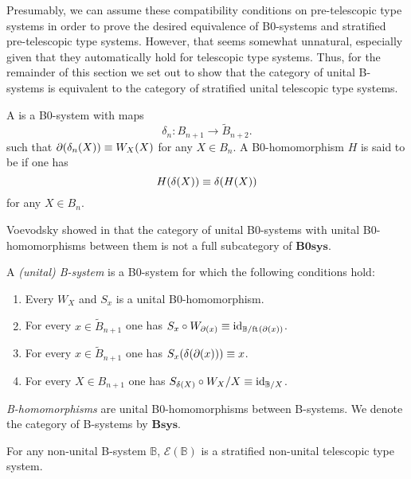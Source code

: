 Presumably, we can assume these compatibility conditions on pre-telescopic type systems in order
to prove the desired equivalence of B0-systems and stratified pre-telescopic type systems. However,
that seems somewhat unnatural, especially given that they automatically hold
for telescopic type systems. Thus, for the remainder of this section we set out to show that
the category of unital B-systems is equivalent to the category of stratified 
unital telescopic type systems.

\begin{defn}
A  is a B0-system with maps
\begin{equation*}
\delta_n : B_{n+1}\to \tilde{B}_{n+2}.
\end{equation*}
such that $\partial_{}(\delta_n(X))\equiv W_{X}(X)$ for any $X\in B_n$. 
A B0-homomorphism $H$ is said to be  if one has
\begin{equation*}
H(\delta(X))\equiv\delta(H(X))
\end{equation*}
for any $X\in B_n$.  
\end{defn}

\begin{rmk}
Voevodsky showed in \cite{VV_B-systems} that the category of unital B0-systems
with unital B0-homomorphisms between them is not a full
subcategory of $\mathbf{B0sys}$. 
\end{rmk}

\begin{defn}
A \emph{(unital) B-system} is a B0-system for which the following conditions
hold:
\begin{enumerate}
\item Every $W_X$ and $S_x$ is a unital B0-homomorphism.
\item For every $x\in \tilde{B}_{n+1}$ one has $S_x\circ W_{\partial_{}(x)}\equiv
{\mathrm{id}_{\mathbb{B}/\mathrm{ft}_{}(\partial_{}(x))}}$. 
\item For every $x\in\tilde{B}_{n+1}$ one has $S_x(\delta(\partial_{}(x)))\equiv x$.
\item For every $X\in B_{n+1}$ one has $S_{\delta(X)}\circ W_X/X\equiv
{\mathrm{id}_{\mathbb{B}/X}}$. 
\end{enumerate}
\emph{B-homomorphisms} are unital B0-homomorphisms between B-systems.
We denote the category of B-systems by $\mathbf{Bsys}$. 
\end{defn}

\begin{lem}
For any non-unital B-system $\mathbb{B}$, $\mathcal{E}(\mathbb{B})$ is a 
stratified non-unital telescopic type system. 
\end{lem}

